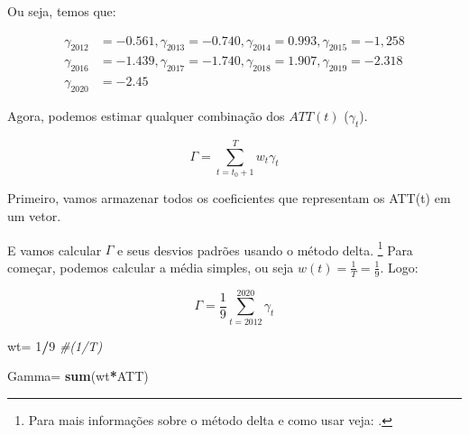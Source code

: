 \documentclass[portugues]{article}
\newenvironment{Shaded}{\begin{snugshade}}{\end{snugshade}}
\newcommand{\CommentTok}[1]{\textcolor[rgb]{0.56,0.35,0.01}{\textit{#1}}}
\newcommand{\DecValTok}[1]{\textcolor[rgb]{0.00,0.00,0.81}{#1}}
\newcommand{\FunctionTok}[1]{\textcolor[rgb]{0.13,0.29,0.53}{\textbf{#1}}}
\newcommand{\NormalTok}[1]{#1}
\newcommand{\OtherTok}[1]{\textcolor[rgb]{0.56,0.35,0.01}{#1}}
\newcommand{\SpecialCharTok}[1]{\textcolor[rgb]{0.81,0.36,0.00}{\textbf{#1}}}
\newcommand{\StringTok}[1]{\textcolor[rgb]{0.31,0.60,0.02}{#1}}
\begin{document}
\begin{boxA}
Ou seja, temos que:

\[\begin{split}
    \gamma_{2012} &= -0.561,  \gamma_{2013} = -0.740, \gamma_{2014} = 0.993, \gamma_{2015} = -1,258 \\
    \gamma_{2016} &= -1.439,  \gamma_{2017} = -1.740, \gamma_{2018} = 1.907, \gamma_{2019} = -2.318 \\
    \gamma_{2020} &= -2.45
\end{split}\]

Agora, podemos estimar qualquer combinação dos $ATT(t)$ ($\gamma_t$).

$$\Gamma = \sum_{t=t_0+1}^{T} w_t \gamma_t$$

Primeiro, vamos armazenar todos os coeficientes que representam os ATT(t) em um vetor.

\begin{Shaded}
\end{Shaded}

E vamos calcular $\Gamma$ e seus desvios padrões usando o método delta. \footnote{Para mais informações sobre o método delta e como usar veja: \cite{ver2012invented}.} Para começar, podemos calcular a média simples, ou seja $w(t) = \frac{1}{T} = \frac{1}{9}$. Logo:

$$ \Gamma = \frac{1}{9} \sum_{t=2012}^{2020} \gamma_t $$

\begin{Shaded}
\begin{Highlighting}[]
\NormalTok{wt}\OtherTok{=} \DecValTok{1}\SpecialCharTok{/}\DecValTok{9} \CommentTok{\#(1/T)}

\NormalTok{Gamma}\OtherTok{=} \FunctionTok{sum}\NormalTok{(wt}\SpecialCharTok{*}\NormalTok{ATT)}


\end{Highlighting}
\end{Shaded}
\end{boxA}
\end{document}
